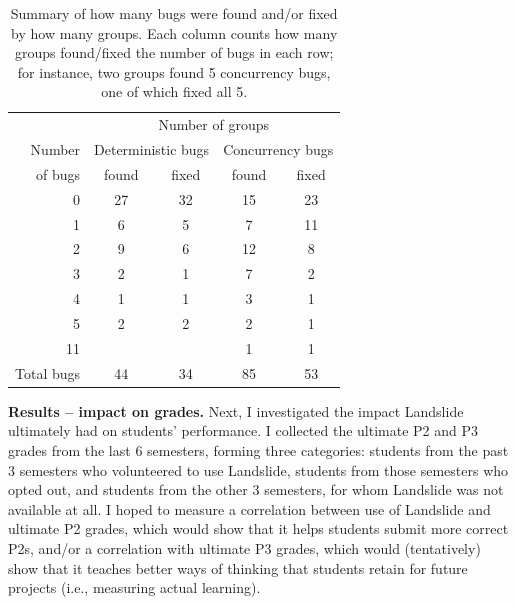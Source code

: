 \begin{table}[h]
	\begin{center}
	\begin{tabular}{r|cc|cc}
	& \multicolumn{4}{c}{Number of groups} \\
	Number & \multicolumn{2}{c|}{Deterministic bugs} & \multicolumn{2}{c}{Concurrency bugs} \\
	of bugs & found & fixed & found & fixed \\
	\hline
	0       & 27    & 32    & 15    & 23    \\
	1       & 6     & 5     & 7     & 11    \\
	2       & 9     & 6     & 12    & 8     \\
	3       & 2     & 1     & 7     & 2     \\
	4       & 1     & 1     & 3     & 1     \\
	5       & 2     & 2     & 2     & 1     \\
	11      &       &       & 1     & 1     \\
	\hline
	Total bugs
	        & 44    & 34    & 85    & 53    \\
	\end{tabular}
	\end{center}
	\caption{Summary of how many bugs were found and/or fixed by how many groups.
	Each column counts how many groups found/fixed the number of bugs in each row;
	for instance, two groups found 5 concurrency bugs, one of which fixed all 5.}
	\label{tab:this-table-sucks-but-it's-the-best-i-got}
\end{table}

{\bf Results -- impact on grades.}
Next, I investigated the impact Landslide ultimately had on students' performance.
I collected the ultimate P2 and P3 grades from the last 6 semesters, forming three categories:
students from the past 3 semesters who volunteered to use Landslide,
students from those semesters who opted out,
and students from the other 3 semesters, for whom Landslide was not available at all.
I hoped to measure a correlation between use of Landslide and ultimate P2 grades,
which would show that it helps students submit more correct P2s,
and/or a correlation with ultimate P3 grades,
which would (tentatively) show that it teaches better ways of thinking that students retain for future projects (i.e., measuring actual learning).

